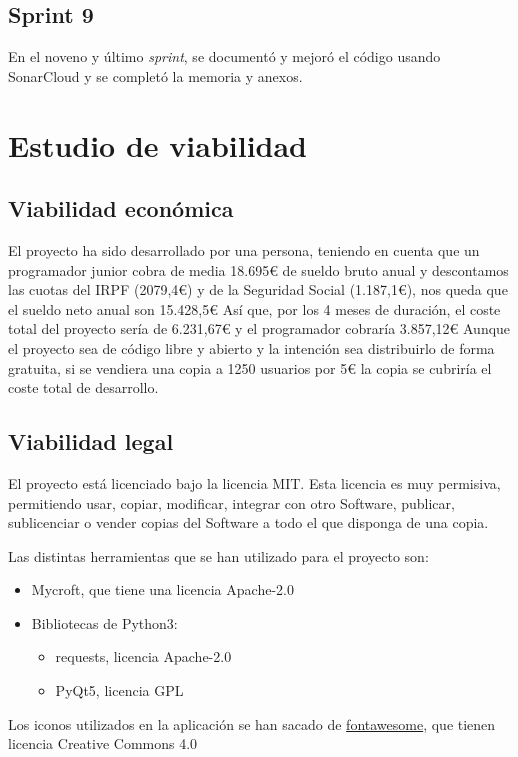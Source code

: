\subsection{Sprint 9}

En el noveno y último \textit{sprint}, se documentó y mejoró el código usando SonarCloud y se completó la memoria y anexos.

\section{Estudio de viabilidad}

\subsection{Viabilidad económica}

El proyecto ha sido desarrollado por una persona, teniendo en cuenta que un programador junior cobra de media 18.695€\cite{SalariosParaEmpleos} de sueldo bruto anual y descontamos las cuotas del IRPF (2079,4€) y de la Seguridad Social (1.187,1€), nos queda que el sueldo neto anual son 15.428,5€
Así que, por los 4 meses de duración, el coste total del proyecto sería de 6.231,67€ y el programador cobraría 3.857,12€
Aunque el proyecto sea de código libre y abierto y la intención sea distribuirlo de forma gratuita, si se vendiera una copia a 1250 usuarios por 5€ la copia se cubriría el coste total de desarrollo.

\subsection{Viabilidad legal}

El proyecto está licenciado bajo la licencia MIT. Esta licencia es muy permisiva, permitiendo usar, copiar, modificar, integrar con otro Software, publicar, sublicenciar o vender copias del Software a todo el que disponga de una copia.

Las distintas herramientas que se han utilizado para el proyecto son:
\begin{itemize}
	\item Mycroft, que tiene una licencia Apache-2.0\cite{penrodHavingRightLicense2017}
	\item Bibliotecas de Python3:
	\begin{itemize}
		\item requests\cite{RequestsSoftware2020}, licencia Apache-2.0
		\item PyQt5\cite{RiverbankComputingLicense}, licencia GPL
	\end{itemize}
\end{itemize}

Los iconos utilizados en la aplicación se han sacado de \href{https://fontawesome.com/icons?d=gallery}{fontawesome}, que tienen licencia Creative Commons 4.0\cite{FontAwesome}